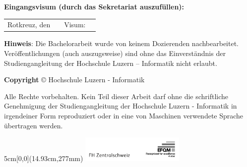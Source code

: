 \vspace{0.8cm}
\noindent
\textbf{Eingangsvisum (durch das Sekretariat auszufüllen):}

\noindent
\renewcommand{\arraystretch}{2}
\begin{tabularx}{\textwidth}{@{}lXlX}
	Rotkreuz, den & & Visum: & \\
	\cline{2-2}
	\cline{4-4}
\end{tabularx}
\renewcommand{\arraystretch}{1}

\vfill
\noindent
\textbf{Hinweis}: Die Bachelorarbeit wurde von keinem Dozierenden nachbearbeitet. Veröffentlichungen (auch auszugsweise) sind ohne das Einverständnis der Studiengangleitung der Hochschule Luzern – Informatik nicht erlaubt.

\vspace{1em}

\noindent
\textbf{Copyright} © \the\year{} Hochschule Luzern - Informatik

\vspace{1em}
\noindent
Alle Rechte vorbehalten. Kein Teil dieser Arbeit darf ohne die schriftliche Genehmigung der Studiengangleitung der Hochschule Luzern - Informatik in irgendeiner Form reproduziert oder in eine von Maschinen verwendete Sprache übertragen werden.


\begin{textblock*}{5cm}[0,0](14.93cm,277mm)
	\includegraphics[keepaspectratio,width=5cm]{img/FHZ_Logo}
\end{textblock*}
